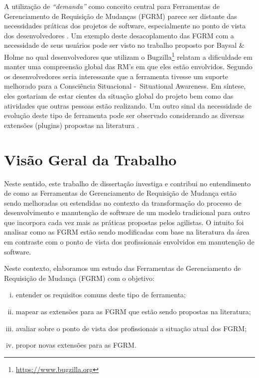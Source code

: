 A utilização de  \textit{``demanda''} como conceito central para Ferramentas de Gerenciamento de
Requisição de Mudanças (FGRM) parece ser distante das necessidades práticas dos projetos de
software, especialmente no ponto de vista dos desenvolvedores
\cite{Baysal:2013:SAP:2486788.2486957}. Um exemplo deste desacoplamento das FGRM com a necessidade
de seus usuários pode ser visto no trabalho proposto por Baysal \& Holme
\cite{baysal2012qualitative} no qual desenvolvedores que utilizam o
Bugzilla\footnote{\url{https://www.bugzilla.org}} relatam a dificuldade em manter uma compreensão
global das RM's em que eles estão envolvidos. Segundo os desenvolvedores seria interessante que a
ferramenta tivesse um suporte melhorado para a Consciência Situacional -~Situational Awareness. Em
síntese, eles gostariam de estar cientes da situação global do projeto bem como das atividades que
outras pessoas estão realizando. Um outro sinal da necessidade de evolução deste tipo de ferramenta
pode ser observado considerando as diversas extensões (plugins) propostas na literatura
\cite{101186,Thung:2014:BIT:2635868.2661678,Kononenko:2014:DED:2591062.2591075}.

\section{Visão Geral da Trabalho}
\label{sec:intro-visao-geral}

Neste sentido, este trabalho de dissertação investiga e contribui no entendimento de
como as Ferramentas de Gerenciamento de Requisição de Mudança estão sendo melhoradas ou estendidas
no contexto da transformação do processo de desenvolvimento e manutenção de software de um modelo
tradicional para outro que incorpora cada vez mais as práticas propostas pelos agilistas. O intuito
foi analisar como as FGRM estão sendo modificadas com base na literatura da área em contraste com o
ponto de vista dos profissionais envolvidos em manutenção de software.

Neste contexto, elaboramos um estudo das Ferramentas de Gerenciamento de Requisição de Mudança (FGRM) com o objetivo:
\begin{enumerate}[(i)]
	\item entender os requisitos comuns deste tipo de ferramenta;
	\item mapear as extensões para as FGRM que estão sendo propostas na literatura;
	\item avaliar sobre o ponto de vista dos profissionais a situação atual dos FGRM\@;
	\item propor novas extensões para as FGRM\@.  
\end{enumerate}


